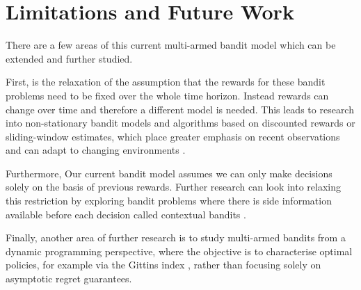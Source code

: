 \documentclass[12pt]{article}
\begin{document}
\section{Limitations and Future Work}

There are a few areas of this current multi-armed bandit model which can be extended and further studied. 

First, is the relaxation of the assumption that the rewards for these bandit problems need to be fixed over the whole time horizon. Instead rewards can change over time and therefore a different model is needed. This leads to research into non-stationary bandit models and algorithms based on discounted rewards or sliding-window estimates, which place greater emphasis on recent observations and can adapt to changing environments \cite{zhou2025bandits}. 

Furthermore, Our current bandit model assumes we can only make decisions solely on the basis of previous rewards. Further research can look into relaxing this restriction by exploring bandit problems where there is side information available before each decision called contextual bandits \cite{DBLP:journals/corr/abs-1807-09809}. 

Finally, another area of further research is to study multi-armed bandits from a dynamic programming perspective, where the objective is to characterise optimal policies, for example via the Gittins index \cite{scully2025gittinsindexdesignprinciple}, rather than focusing solely on asymptotic regret guarantees.

\newpage

\printbibliography
\end{document}
